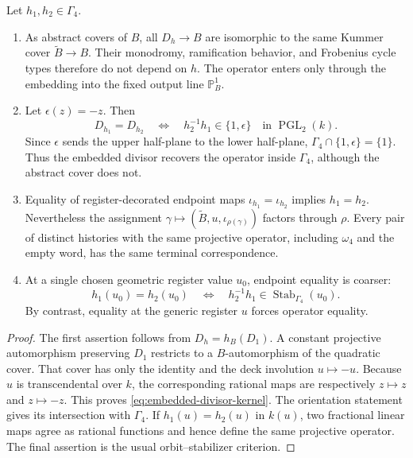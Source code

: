 \begin{proposition}
\label{prop:quadratic-register-collapse}
Let \(h_1,h_2\in\Gamma_4\).
\begin{enumerate}
\item As abstract covers of \(B\), all \(D_h\to B\) are isomorphic to the same
Kummer cover \(\widetilde B\to B\).  Their monodromy, ramification behavior, and
Frobenius cycle types therefore do not depend on \(h\).  The operator enters only
through the embedding into the fixed output line \(\mathbb P^1_B\).
\item Let \(\epsilon(z)=-z\).  Then
\begin{equation}
 D_{h_1}=D_{h_2}
 \quad\Longleftrightarrow\quad
 h_2^{-1}h_1\in\{1,\epsilon\}
 \quad\text{in }\operatorname{PGL}_2(k).
 \label{eq:embedded-divisor-kernel}
\end{equation}
Since \(\epsilon\) sends the upper half-plane to the lower half-plane,
\(\Gamma_4\cap\{1,\epsilon\}=\{1\}\).  Thus the embedded divisor recovers the
operator inside \(\Gamma_4\), although the abstract cover does not.
\item Equality of register-decorated endpoint maps
\(\iota_{h_1}=\iota_{h_2}\) implies \(h_1=h_2\).  Nevertheless the assignment
\(\gamma\mapsto(\widetilde B,u,\iota_{\rho(\gamma)})\) factors through
\(\rho\).  Every pair of distinct histories with the same projective operator,
including \(\omega_4\) and the empty word, has the same terminal
correspondence.
\item At a single chosen geometric register value \(u_0\), endpoint equality is
coarser:
\begin{equation}
 h_1(u_0)=h_2(u_0)
 \quad\Longleftrightarrow\quad
 h_2^{-1}h_1\in\operatorname{Stab}_{\Gamma_4}(u_0).
 \label{eq:closed-endpoint-kernel}
\end{equation}
By contrast, equality at the generic register \(u\) forces operator equality.
\end{enumerate}
\end{proposition}

\begin{proof}
The first assertion follows from \(D_h=h_B(D_1)\).  A constant projective
automorphism preserving \(D_1\) restricts to a \(B\)-automorphism of the quadratic
cover.  That cover has only the identity and the deck involution \(u\mapsto-u\).
Because \(u\) is transcendental over \(k\), the corresponding rational maps are
respectively \(z\mapsto z\) and \(z\mapsto-z\).  This proves
\eqref{eq:embedded-divisor-kernel}.  The orientation statement gives its
intersection with \(\Gamma_4\).  If \(h_1(u)=h_2(u)\) in \(k(u)\), two
fractional linear maps agree as rational functions and hence define the same
projective operator.  The final assertion is the usual orbit--stabilizer
criterion.
\end{proof}

